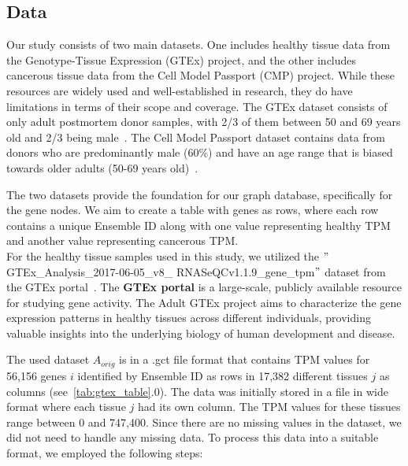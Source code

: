 \subsection{Data} \label{subsec:data}

Our study consists of two main datasets.
One includes healthy tissue data from the Genotype-Tissue Expression (GTEx) project,
and the other includes cancerous tissue data from the Cell Model Passport (CMP) project.
While these resources are widely used and well-established in research, they do have limitations in terms of their scope and coverage.
The GTEx dataset consists of only adult postmortem donor samples, with 2/3 of them between 50 and 69 years old and 2/3 being male~\cite{GTEX_modelannotation}.
The Cell Model Passport dataset contains data from donors who are predominantly male (60\%)
and have an age range that is biased towards older adults (50-69 years old)~\cite{CMP_modelannotation}.

The two datasets provide the foundation for our graph database, specifically for the gene nodes.
We aim to create a table with genes as rows,
where each row contains a unique Ensemble ID along with one value representing healthy TPM and another value representing cancerous TPM.
\\

For the healthy tissue samples used in this study,
we utilized the $"$GTEx\_Analysis\_2017-06-05\_v8\_\newline
RNASeQCv1.1.9\_gene\_tpm$"$ dataset from the GTEx portal~\cite{gtex_download}.
The \textbf{GTEx portal} is a large-scale, publicly available resource for studying gene activity.
The Adult GTEx project aims to characterize the gene expression patterns in healthy tissues across different individuals,
providing valuable insights into the underlying biology of human development and disease.

The used dataset $A_{orig}$ is in a .gct file format that contains TPM values for 56,156 genes $i$ identified by
Ensemble ID as rows in 17,382 different tissues $j$ as columns (see~\cref{tab:gtex_table}.0).
The data was initially stored in a file in wide format where each tissue $j$ had its own column.
The TPM values for these tissues range between 0 and 747,400.
Since there are no missing values in the dataset, we did not need to handle any missing data.
To process this data into a suitable format, we employed the following steps:

